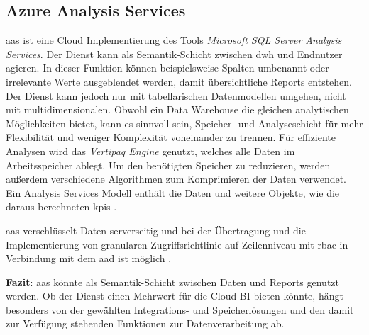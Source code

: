 \subsection{Azure Analysis Services} \label{sec:grundlagen:azure_dienste:analysisServices}
\ac{aas} ist eine Cloud Implementierung des Tools \textit{Microsoft SQL Server Analysis Services}. Der Dienst kann als Semantik-Schicht zwischen \ac{dwh} und Endnutzer agieren. In dieser Funktion können beispielsweise Spalten umbenannt oder irrelevante Werte ausgeblendet werden, damit übersichtliche Reports entstehen. Der Dienst kann jedoch nur mit tabellarischen Datenmodellen umgehen, nicht mit multidimensionalen. Obwohl ein Data Warehouse die gleichen analytischen Möglichkeiten bietet, kann es sinnvoll sein, Speicher- und Analyseschicht für mehr Flexibilität und weniger Komplexität voneinander zu trennen. Für effiziente Analysen wird das \textit{Vertipaq Engine} genutzt, welches alle Daten im Arbeitsspeicher ablegt. Um den benötigten Speicher zu reduzieren, werden außerdem verschiedene Algorithmen zum Komprimieren der Daten verwendet. Ein Analysis Services Modell enthält die Daten und weitere Objekte, wie die daraus berechneten \acp{kpi} \cite{how_beyond_2020}.

\ac{aas} verschlüsselt Daten serverseitig und bei der Übertragung und die Implementierung von granularen Zugriffsrichtlinie auf Zeilenniveau mit \ac{rbac} in Verbindung mit dem \ac{aad} ist möglich \cite{duncan_what_2021}.

\textbf{Fazit}: \ac{aas} könnte als Semantik-Schicht zwischen Daten und Reports genutzt werden. Ob der Dienst einen Mehrwert für die Cloud-BI bieten könnte, hängt besonders von der gewählten Integrations- und Speicherlösungen und den damit zur Verfügung stehenden Funktionen zur Datenverarbeitung ab.


